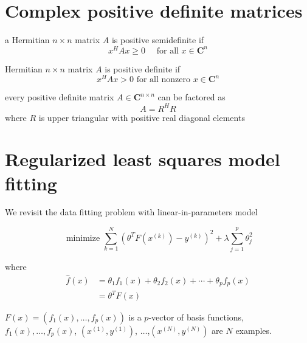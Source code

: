 \section{Complex positive definite matrices}

\begin{definition}
    a Hermitian $n \times n$ matrix $A$ is positive semidefinite if
\begin{equation}
x^{H} A x \geq 0 \quad \text { for all } x \in \mathbf{C}^{n}
\end{equation}
\end{definition}

\begin{definition} Hermitian $n \times n$ matrix $A$ is positive definite if
\begin{equation}
x^{H} A x>0 \text { for all nonzero } x \in \mathbf{C}^{n}
\end{equation}
\end{definition}

\begin{theorem}
    every positive definite matrix $A \in \mathbf{C}^{n \times n}$ can be factored as
\begin{equation}
A=R^{H} R
\end{equation}
where $R$ is upper triangular with positive real diagonal elements
\end{theorem}


\section{Regularized least squares model fitting}

We revisit the data fitting problem with linear-in-parameters model

\begin{problem}
    
\begin{equation}\text{ minimize } \sum_{k=1}^{N}\left(\theta^{T} F\left(x^{(k)}\right)-y^{(k)}\right)^{2}+\lambda \sum_{j=1}^{p} \theta_{j}^{2}\end{equation}

 where  \begin{equation}
    \begin{aligned}
    \hat{f}(x) &=\theta_{1} f_{1}(x)+\theta_{2} f_{2}(x)+\cdots+\theta_{p} f_{p}(x) \\
    &=\theta^{T} F(x)
    \end{aligned}
    \end{equation}

    $F(x)=\left(f_{1}(x), \ldots, f_{p}(x)\right)$ is a $p$-vector of basis functions, $f_{1}(x), \ldots, f_{p}(x)$, $\left(x^{(1)}, y^{(1)}\right)$, $\ldots$,$\left(x^{(N)}, y^{(N)}\right)$ are $N$ examples.
\end{problem}

